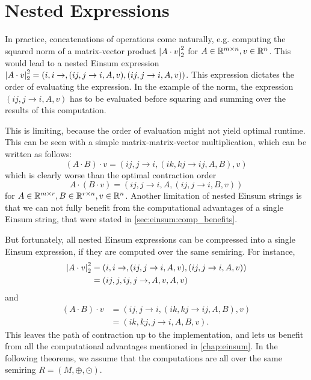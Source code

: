 \chapter{Nested Expressions}
\label{chap:nested}

In practice, concatenations of operations come naturally, e.g. computing the squared norm of a matrix-vector product $\left\lvert A \cdot v \right\rvert_2^2$
for $A \in \mathbb{R}^{m \times n}, v \in \mathbb{R}^n$.
This would lead to a nested Einsum expression $\left\lvert A \cdot v \right\rvert_2^2 = (i,i \rightarrow , (ij, j \rightarrow i, A, v), (ij, j \rightarrow i, A, v))$.
This expression dictates the order of evaluating the expression.
In the example of the norm, the expression $(ij, j \rightarrow i, A, v)$ has to be evaluated before squaring and summing over the results of this computation.

This is limiting, because the order of evaluation might not yield optimal runtime.
This can be seen with a simple matrix-matrix-vector multiplication, which can be written as follows:
$$(A \cdot B) \cdot v = (ij, j \rightarrow i, (ik, kj \rightarrow ij, A, B), v)$$
which is clearly worse than the optimal contraction order
$$A \cdot (B \cdot v) = (ij, j \rightarrow i, A, (ij, j \rightarrow i, B, v))$$
for $A \in \mathbb{R}^{m \times r}, B \in \mathbb{R}^{r \times n}, v \in \mathbb{R}^n$.
Another limitation of nested Einsum strings is that we can not fully benefit from the computational advantages of a single Einsum string, that were stated in \cref{sec:einsum:comp_benefits}.

But fortunately, all nested Einsum expressions can be compressed into a single Einsum expression, if they are computed over the same semiring.
For instance,
\begin{align*}
    \left\lvert A \cdot v \right\rvert_2^2 & = (i,i \rightarrow , (ij, j \rightarrow i, A, v), (ij, j \rightarrow i, A, v)) \\
                        & = (ij, j, ij, j \rightarrow, A, v, A, v)
\end{align*}
and
\begin{align*}
    (A \cdot B) \cdot v & = (ij, j \rightarrow i, (ik, kj \rightarrow ij, A, B), v) \\
                        & = (ik, kj, j \rightarrow i, A, B, v).
\end{align*}
This leaves the path of contraction up to the implementation, and lets us benefit from all the computational advantages mentioned in \cref{chap:einsum}.
In the following theorems, we assume that the computations are all over the same semiring $R = (M, \oplus, \odot)$.


